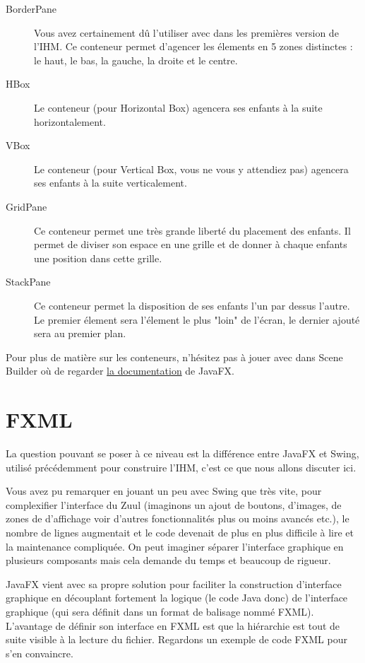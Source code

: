 \begin{appendix}
\begin{description}
  \item [BorderPane] Vous avez certainement dû l'utiliser avec  dans les premières version de l'IHM. Ce conteneur permet d'agencer les élements en 5 zones distinctes : le haut, le bas, la gauche, la droite et le centre.
  \item [HBox] Le conteneur  (pour Horizontal Box) agencera ses enfants à la suite horizontalement.
  \item [VBox] Le conteneur  (pour Vertical Box, vous ne vous y attendiez pas) agencera ses enfants à la suite verticalement.
  \item [GridPane] Ce conteneur permet une très grande liberté du placement des enfants. Il permet de diviser son espace en une grille et de donner à chaque enfants une position dans cette grille.
  \item [StackPane] Ce conteneur permet la disposition de ses enfants l'un par dessus l'autre. Le premier élement sera l'élement le plus "loin" de l'écran, le dernier ajouté sera au premier plan.
\end{description}

Pour plus de matière sur les conteneurs, n'hésitez pas à jouer avec dans Scene Builder où de regarder \href{https://openjfx.io/javadoc/11/index.html}{la documentation} de JavaFX.

\section{FXML}

La question pouvant se poser à ce niveau est la différence entre JavaFX et Swing, utilisé précédemment pour construire l'IHM, c'est ce que nous allons discuter ici.

Vous avez pu remarquer en jouant un peu avec Swing que très vite, pour complexifier l'interface du Zuul (imaginons un ajout de boutons, d'images, de zones de d'affichage voir d'autres fonctionnalités plus ou moins avancés etc.), le nombre de lignes augmentait et le code devenait de plus en plus difficile à lire et la maintenance compliquée. On peut imaginer séparer l'interface graphique en plusieurs composants mais cela demande du temps et beaucoup de rigueur.

JavaFX vient avec sa propre solution pour faciliter la construction d'interface graphique en découplant fortement la logique (le code Java donc) de l'interface graphique (qui sera définit dans un format de balisage nommé FXML). L'avantage de définir son interface en FXML est que la hiérarchie est tout de suite visible à la lecture du fichier. Regardons un exemple de code FXML pour s'en convaincre.


\end{appendix}
